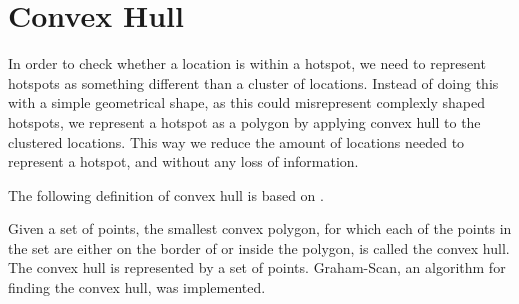 \section{Convex Hull}\label{convex_hull}
In order to check whether a location is within a hotspot, we need to represent hotspots as something different than a cluster of locations.
Instead of doing this with a simple geometrical shape, as this could misrepresent complexly shaped hotspots, we represent a hotspot as a polygon by applying convex hull to the clustered locations.
This way we reduce the amount of locations needed to represent a hotspot, and without any loss of information.

The following definition of convex hull is based on \citet[section 33.3]{aadbook}.

Given a set of points, the smallest convex polygon, for which each of the points in the set are either on the border of or inside the polygon, is called the convex hull\cite[33.1-5]{aadbook}.
The convex hull is represented by a set of points.
Graham-Scan\cite[page 1031]{aadbook}, an algorithm for finding the convex hull, was implemented.
